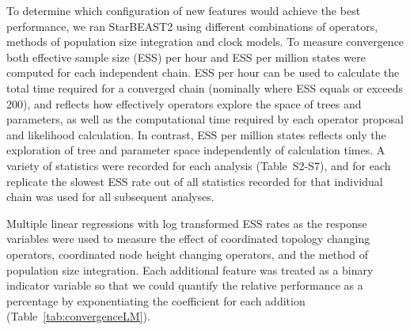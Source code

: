 \documentclass[nogrid]{MBE}%
\begin{document}
To determine which configuration of new features would achieve the best
performance, we ran StarBEAST2 using different combinations of operators,
methods of population size integration and clock models. To measure
convergence both effective sample size (ESS) per hour and ESS per million
states were computed for each independent chain. ESS per hour can be used to
calculate the total time required for a converged chain (nominally where ESS
equals or exceeds 200), and reflects how effectively operators explore the
space of trees and parameters, as well as the computational time required by
each operator proposal and likelihood calculation. In contrast, ESS per
million states reflects only the exploration of tree and parameter space
independently of calculation times. A variety of statistics were recorded for
each analysis (Table~S2-S7), and for each replicate the slowest ESS rate
out of all statistics recorded for that individual chain was used for all
subsequent analyses.

Multiple linear regressions with log transformed ESS rates as the response
variables were used to measure the effect of coordinated topology changing
operators, coordinated node height changing operators, and the method of
population size integration. Each additional feature was treated as a binary
indicator variable so that we could quantify the relative performance as a
percentage by exponentiating the coefficient for each addition
(Table~\ref{tab:convergenceLM}).
\end{document}
